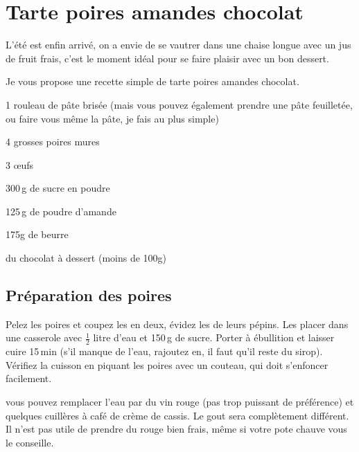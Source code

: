 \section{Tarte poires amandes chocolat}

L'été est enfin arrivé, on a envie de se vautrer dans une chaise longue avec
un jus de fruit frais, c'est le moment idéal pour se faire plaisir avec un bon
dessert.

Je vous propose une recette simple de tarte poires amandes chocolat.

\begin{ingredients}
	\item 1 rouleau de pâte brisée (mais vous pouvez également prendre une
	pâte feuilletée, ou faire vous même la pâte, je fais au plus simple)
	\item 4 grosses poires mures
	\item 3 \oe{}ufs
	\item 300\,g de sucre en poudre
	\item 125\,g de poudre d'amande
	\item 175g de beurre
	\item du chocolat à dessert (moins de 100g)
\end{ingredients}

\subsection*{Préparation des poires}

Pelez les poires et coupez les en deux, évidez les de leurs pépins. Les placer
dans une casserole avec $\frac{1}{2}$ litre d'eau et 150\,g de sucre. Porter à ébullition
et laisser cuire 15\,min (s'il manque de l'eau, rajoutez en, il faut qu'il reste
du sirop). Vérifiez la cuisson en piquant les poires avec un couteau, qui doit
s'enfoncer facilement.

	\begin{remarque}

		vous pouvez remplacer l'eau par du vin rouge (pas trop puissant de
		préférence) et quelques cuillères à café de crème de cassis. Le gout
		sera complètement différent. Il n'est pas utile de prendre du rouge
		bien frais, même si votre pote chauve vous le conseille.

	\end{remarque}

